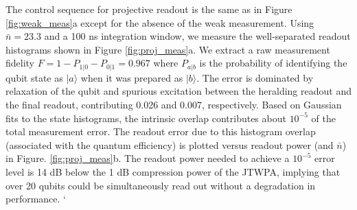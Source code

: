 The control sequence for projective readout is the same as in Figure \ref{fig:weak_meas}a except for the absence of the weak measurement.  Using $\bar{n} = 23.3$ and a 100 ns integration window, we measure the well-separated readout histograms shown in Figure \ref{fig:proj_meas}a.  We extract a raw measurement fidelity $F = 1 - P_{1|0} - P_{0|1} = 0.967$ where $P_{a|b}$ is the probability of identifying the qubit state as $|a\rangle$ when it was prepared as $|b\rangle$.  The error is dominated by relaxation of the qubit and spurious excitation between the heralding readout and the final readout, contributing 0.026 and 0.007, respectively.  Based on Gaussian fits to the state histograms, the intrinsic overlap contributes about $10^{-5}$ of the total measurement error.  The readout error due to this histogram overlap (associated with the quantum efficiency) is plotted versus readout power (and $\bar{n}$) in Figure. \ref{fig:proj_meas}b.  The readout power needed to achieve a $10^{-5}$ error level is 14 dB below the 1 dB compression power of the JTWPA, implying that over 20 qubits could be simultaneously read out without a degradation in performance.
`






